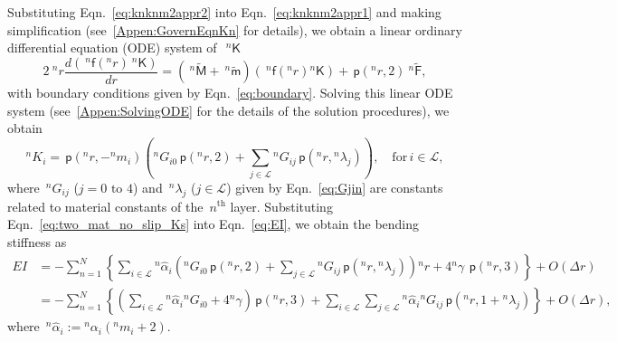 \documentclass[preprint,10pt,times]{elsarticle}
\numberwithin{equation}{section}
\renewcommand{\u}[1]{\boldsymbol{#1}}
\newcommand{\usf}[1]{\u{\mathsf #1}}
\newcommand{\pr}[1]{\left( #1 \right)}
\newcommand{\p}{\,\mathsf{p}}
\renewcommand{\>}{$\Rightarrow$}
\begin{document}
Substituting Eqn.~\eqref{eq:knknm2appr2} into Eqn.~\eqref{eq:knknm2appr1} and making simplification (see~\ref{Appen:GovernEqnKn} for details), we obtain a linear ordinary differential equation (ODE) system of~$~^{n}{\usf{K}}$
\begin{equation}
  2 ~^{n}\!{r} \frac{d \pr{~^{n}\usf{f}({}^{n}\!r)~^{n}{\usf{K}}}}{dr} = \pr{~^{n}\tilde{\usf{M}} + ~^{n}\tilde{\usf{m}}} \pr{~^{n}\usf{f}({}^{n}\!r){}^{n}{\usf{K}}} + \p\pr{{}^{n}\!{r},2} ~^{n}\tilde{\usf{F}},
	\label{eq:GovernEqnKn}
\end{equation}
with boundary conditions given by Eqn.~\eqref{eq:boundary}. Solving this linear ODE system (see~\ref{Appen:SolvingODE} for the details of the solution procedures), we obtain
\begin{equation}
{}^{n}\!{K_{i}} = \p\pr{{}^{n}\!{r},-{}^{n}\!{m_{i}}} \left( {}^{n}\!G_{i0} \p\pr{{}^{n}\!{r},2} + \sum_{j \in \mathcal{L}} {}^{n}\!G_{ij} \p\pr{{}^{n}\!{r},{}^{n}\!\lambda_{j}} \right), \quad \text{for}\, i \in \mathcal{L},
\label{eq:two_mat_no_slip_Ks}
\end{equation}
where~${}^{n}\!G_{ij}$ ($j = \text{0 to 4}$) and~${}^{n}\!\lambda_{j}$ ($j \in \mathcal{L}$) given by Eqn.~\eqref{eq:Gjin} are constants related to material constants of the~$n^{\text{th}}$ layer.
Substituting Eqn.~\eqref{eq:two_mat_no_slip_Ks} into Eqn.~\eqref{eq:EI}, we obtain the bending stiffness as
\begin{equation}
\begin{aligned}
	EI & = - \sum_{n=1}^{N} \left\lbrace \sum_{i \in \mathcal{L}} {}^{n}\!{\hat{\alpha}_{i}} \left( {}^{n}\!G_{i0} \p\pr{{}^{n}\!{r},2} + \sum_{j \in \mathcal{L}} {}^{n}\!G_{ij} \p\pr{{}^{n}\!{r},{}^{n}\!\lambda_{j}} \right) {}^{n}\!{r} + 4{}^{n}\!\gamma~ \p\pr{{}^{n}\!{r},3} \right\rbrace + O(\Delta r) \\
	& =  - \sum_{n=1}^{N} \left\lbrace \left( \sum_{i \in \mathcal{L}} {}^{n}\!{\hat{\alpha}_{i}} {}^{n}\!G_{i0} + 4{}^{n}\!\gamma \right) \p\pr{{}^{n}\!{r},3}+ \sum_{i \in \mathcal{L}} \sum_{j \in \mathcal{L}} {}^{n}\!{\hat{\alpha}_{i}} {}^{n}\!G_{ij} \p\pr{{}^{n}\!{r},1 + {}^{n}\!\lambda_{j}} \right\rbrace + O(\Delta r),
\end{aligned}
\end{equation}
where~${}^{n}\!{\hat{\alpha}_{i}} := {}^{n}\!{\alpha_{i}} \left( {}^{n}\!{m_{i}} + 2\right)$.
\end{document}
